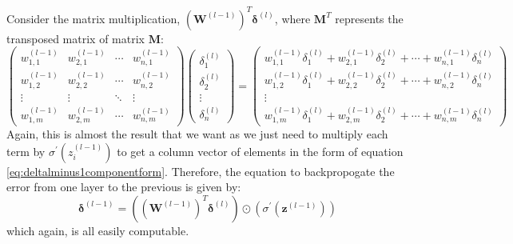 \documentclass[12pt]{report}
\begin{document}
Consider the matrix multiplication, ${\left(\mathbf{W}^{\left(l-1\right)}\right)}^{T}\bm{\delta}^{\left(l\right)}$, where $\mathbf{M}^T$ represents the transposed matrix of matrix $\mathbf{M}$:
\begin{equation}
    \begin{pmatrix}w^{\left(l-1\right)}_{1,1}&w^{\left(l-1\right)}_{2,1}&\cdots&w^{\left(l-1\right)}_{n,1}\\[0.3em]w^{\left(l-1\right)}_{1,2}&w^{\left(l-1\right)}_{2,2}&\cdots&w^{\left(l-1\right)}_{n,2}\\\vdots&\vdots&\ddots&\vdots\\w^{\left(l-1\right)}_{1,m}&w^{\left(l-1\right)}_{2,m}&\cdots&w^{\left(l-1\right)}_{n,m}\end{pmatrix}\begin{pmatrix}{\delta}^{\left(l\right)}_1\\[0.3em]{\delta}^{\left(l\right)}_2\\\vdots \\{\delta}^{\left(l\right)}_n\end{pmatrix}=\begin{pmatrix}w^{\left(l-1\right)}_{1,1}{\delta}^{\left(l\right)}_1+w^{\left(l-1\right)}_{2,1}{\delta}^{\left(l\right)}_2+\cdots +w^{\left(l-1\right)}_{n,1}{\delta}^{\left(l\right)}_n\\[0.3em]w^{\left(l-1\right)}_{1,2}{\delta}^{\left(l\right)}_1+w^{\left(l-1\right)}_{2,2}{\delta}^{\left(l\right)}_2+\cdots +w^{\left(l-1\right)}_{n,2}{\delta}^{\left(l\right)}_n\\\vdots\\w^{\left(l-1\right)}_{1,m}{\delta}^{\left(l\right)}_1+w^{\left(l-1\right)}_{2,m}{\delta}^{\left(l\right)}_2+\cdots +w^{\left(l-1\right)}_{n,m}{\delta}^{\left(l\right)}_n\end{pmatrix}
\end{equation}
Again, this is almost the result that we want as we just need to multiply each term by ${\sigma}^{\prime} \left(z^{\left(l-1\right)}_i\right)$ to get a column vector of elements in the form of equation \ref{eq:deltalminus1componentform}. Therefore, the equation to backpropogate the error from one layer to the previous is given by:
\begin{equation}\label{eq:backpropogateError}
    \bm{\delta}^{\left(l-1\right)}=\left({\left(\mathbf{W}^{\left(l-1\right)}\right)}^{T}\bm{\delta}^{\left(l\right)}\right)\odot\left({\sigma}^{\prime} \left(\mathbf{z}^{\left(l-1\right)}\right)\right)
\end{equation}
which again, is all easily computable.
\end{document}
